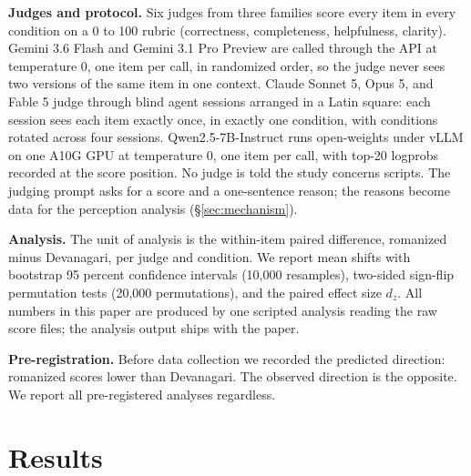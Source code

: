 \documentclass[10pt,twocolumn]{article}
\begin{document}
\textbf{Judges and protocol.} Six judges from three families score every item in every condition on a 0 to 100 rubric (correctness, completeness, helpfulness, clarity). Gemini 3.6 Flash and Gemini 3.1 Pro Preview are called through the API at temperature 0, one item per call, in randomized order, so the judge never sees two versions of the same item in one context. Claude Sonnet 5, Opus 5, and Fable 5 judge through blind agent sessions arranged in a Latin square: each session sees each item exactly once, in exactly one condition, with conditions rotated across four sessions. Qwen2.5-7B-Instruct runs open-weights under vLLM on one A10G GPU at temperature 0, one item per call, with top-20 logprobs recorded at the score position. No judge is told the study concerns scripts. The judging prompt asks for a score and a one-sentence reason; the reasons become data for the perception analysis (\S\ref{sec:mechanism}).

\textbf{Analysis.} The unit of analysis is the within-item paired difference, romanized minus Devanagari, per judge and condition. We report mean shifts with bootstrap 95 percent confidence intervals (10{,}000 resamples), two-sided sign-flip permutation tests (20{,}000 permutations), and the paired effect size $d_z$. All numbers in this paper are produced by one scripted analysis reading the raw score files; the analysis output ships with the paper.

\textbf{Pre-registration.} Before data collection we recorded the predicted direction: romanized scores lower than Devanagari. The observed direction is the opposite. We report all pre-registered analyses regardless.

\section{Results}
\label{sec:results}
\end{document}
